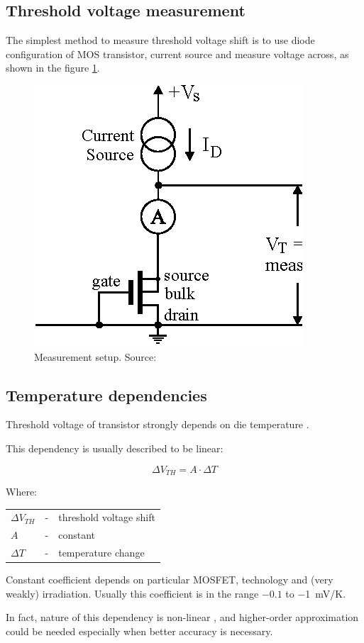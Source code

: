     \subsection{Threshold voltage measurement}
        The simplest method to measure threshold voltage shift is to use diode configuration of MOS transistor, current source and measure voltage across, as shown in the figure \ref{MOS_measurement_setup}.

        \begin{figure}[H]
            \centering
            \includegraphics[width=0.5\paperwidth]{img/03/Vth-measurement-setup.eps}
            \caption{Measurement setup. Source: \cite{pMOS_dosimeters_radfets}}
            \label{MOS_measurement_setup}
        \end{figure}

   \newpage
    \subsection{Temperature dependencies}
        Threshold voltage of transistor strongly depends on die temperature \cite{managing_temperature_effects_in_nanoscale_adaptive_systems}.

        This dependency is usually described to be linear:

        $$\Delta V_{TH} = A \cdot \Delta T$$

        Where:

        \begin{tabular}{lcl}
            $\Delta V_{TH}$ & - & threshold voltage shift \\
            $A$ & - & constant \\
            $\Delta T$ & - & temperature change \\
        \end{tabular}
        \bigskip

        Constant coefficient depends on particular MOSFET, technology and (very weakly) irradiation. Usually this coefficient is in the range $-0.1$ to \SI{-1}{\milli\volt/\kelvin}.

        In fact, nature of this dependency is non-linear \cite{managing_temperature_effects_in_nanoscale_adaptive_systems}, and higher-order approximation could be needed especially when better accuracy is necessary.
